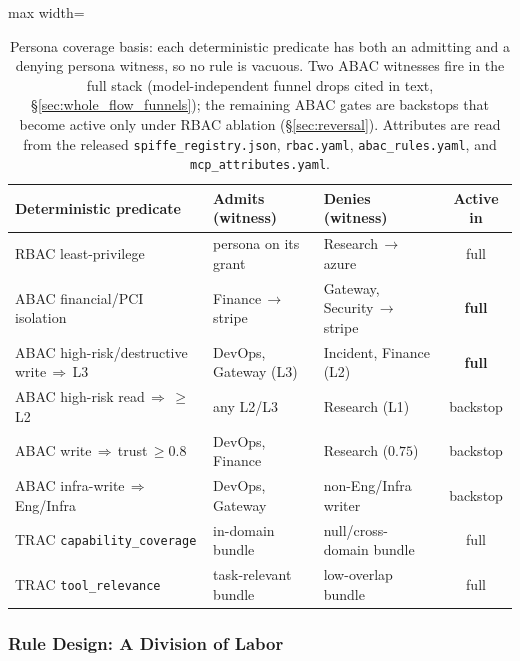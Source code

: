 \documentclass[sigconf,review,anonymous]{acmart}
\begin{document}
\begin{table}[!t]
\centering
\caption{Persona coverage basis: each deterministic predicate has both an admitting and a denying persona witness, so no rule is vacuous. Two ABAC witnesses fire in the full stack (model-independent funnel drops cited in text, \S\ref{sec:whole_flow_funnels}); the remaining ABAC gates are backstops that become active only under RBAC ablation (\S\ref{sec:reversal}). Attributes are read from the released \texttt{spiffe\_registry.json}, \texttt{rbac.yaml}, \texttt{abac\_rules.yaml}, and \texttt{mcp\_attributes.yaml}.}
\label{tab:persona_coverage}
\footnotesize
\setlength{\tabcolsep}{4pt}
\begin{adjustbox}{max width=\columnwidth}
\begin{tabular}{@{}lllc@{}}
\toprule
\textbf{Deterministic predicate} & \textbf{Admits (witness)} & \textbf{Denies (witness)} & \textbf{Active in} \\
\midrule
RBAC least-privilege                                & persona on its grant   & Research\,$\to$\,azure           & full \\
ABAC financial/PCI isolation                        & Finance\,$\to$\,stripe & Gateway, Security\,$\to$\,stripe & \textbf{full} \\
ABAC high-risk/destructive write\,$\Rightarrow$\,L3 & DevOps, Gateway (L3)   & Incident, Finance (L2)           & \textbf{full} \\
ABAC high-risk read\,$\Rightarrow\,\geq$L2          & any L2/L3              & Research (L1)                    & backstop \\
ABAC write\,$\Rightarrow$\,trust\,$\geq 0.8$        & DevOps, Finance        & Research ($0.75$)                & backstop \\
ABAC infra-write\,$\Rightarrow$\,Eng/Infra          & DevOps, Gateway        & non-Eng/Infra writer            & backstop \\
TRAC \texttt{capability\_coverage}                  & in-domain bundle       & null/cross-domain bundle        & full \\
TRAC \texttt{tool\_relevance}                       & task-relevant bundle   & low-overlap bundle              & full \\
\bottomrule
\end{tabular}
\end{adjustbox}
\end{table}

\subsubsection{Rule Design: A Division of Labor}
\label{sec:rule_rationale}
\end{document}
